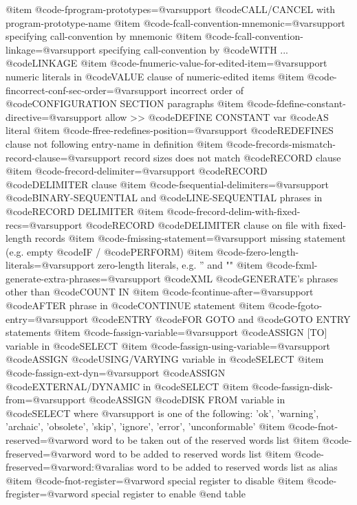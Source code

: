 @item @code{-fprogram-prototypes=@var{support}}
@code{CALL}/CANCEL with program-prototype-name
@item @code{-fcall-convention-mnemonic=@var{support}}
specifying call-convention by mnemonic
@item @code{-fcall-convention-linkage=@var{support}}
specifying call-convention by @code{WITH} ... @code{LINKAGE}
@item @code{-fnumeric-value-for-edited-item=@var{support}}
numeric literals in @code{VALUE} clause of numeric-edited items
@item @code{-fincorrect-conf-sec-order=@var{support}}
incorrect order of @code{CONFIGURATION SECTION} paragraphs
@item @code{-fdefine-constant-directive=@var{support}}
allow >> @code{DEFINE CONSTANT} var @code{AS} literal
@item @code{-ffree-redefines-position=@var{support}}
@code{REDEFINES} clause not following entry-name in definition
@item @code{-frecords-mismatch-record-clause=@var{support}}
record sizes does not match @code{RECORD} clause
@item @code{-frecord-delimiter=@var{support}}
@code{RECORD} @code{DELIMITER} clause
@item @code{-fsequential-delimiters=@var{support}}
@code{BINARY-SEQUENTIAL} and @code{LINE-SEQUENTIAL} phrases in @code{RECORD DELIMITER}
@item @code{-frecord-delim-with-fixed-recs=@var{support}}
@code{RECORD} @code{DELIMITER} clause on file with fixed-length records
@item @code{-fmissing-statement=@var{support}}
missing statement (e.g. empty @code{IF} / @code{PERFORM})
@item @code{-fzero-length-literals=@var{support}}
zero-length literals, e.g. '' and ""
@item @code{-fxml-generate-extra-phrases=@var{support}}
@code{XML} @code{GENERATE}'s phrases other than @code{COUNT IN}
@item @code{-fcontinue-after=@var{support}}
@code{AFTER} phrase in @code{CONTINUE} statement
@item @code{-fgoto-entry=@var{support}}
@code{ENTRY} @code{FOR GOTO} and @code{GOTO ENTRY} statements
@item @code{-fassign-variable=@var{support}}
@code{ASSIGN} [TO] variable in @code{SELECT}
@item @code{-fassign-using-variable=@var{support}}
@code{ASSIGN} @code{USING}/VARYING variable in @code{SELECT}
@item @code{-fassign-ext-dyn=@var{support}}
@code{ASSIGN} @code{EXTERNAL}/DYNAMIC in @code{SELECT}
@item @code{-fassign-disk-from=@var{support}}
@code{ASSIGN} @code{DISK FROM} variable in @code{SELECT}
where @var{support} is one of the following:
'ok', 'warning', 'archaic', 'obsolete', 'skip', 'ignore', 'error', 'unconformable'
@item @code{-fnot-reserved=@var{word}}
word to be taken out of the reserved words list
@item @code{-freserved=@var{word}}
word to be added to reserved words list
@item @code{-freserved=@var{word}:@var{alias}}
word to be added to reserved words list as alias
@item @code{-fnot-register=@var{word}}
special register to disable
@item @code{-fregister=@var{word}}
special register to enable
@end table
